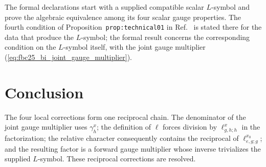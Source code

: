 \documentclass{article}
\begin{document}
The formal declarations start with a supplied compatible scalar $L$-symbol and
prove the algebraic equivalence among its four scalar gauge properties. The
fourth condition of Proposition~\texttt{prop:technical01} in
Ref.~\cite{FrancoRubio2025MPUGauging} is stated there for the data that
produce the $L$-symbol; the formal result concerns the corresponding condition
on the $L$-symbol itself, with the joint gauge multiplier
(\ref{eq:fbc25_bi_joint_gauge_multiplier}).

\section{Conclusion}

The four local corrections form one reciprocal chain. The denominator of the
joint gauge multiplier uses $\gamma_h^x$; the definition of $\ell$ forces
division by $\ell^x_{g,h;h}$ in the factorization; the relative character
consequently contains the reciprocal of $\ell^{x_0}_{e,g;g}$; and the resulting
factor is a forward gauge multiplier whose inverse trivializes the supplied
$L$-symbol. These reciprocal corrections are resolved.



\end{document}
